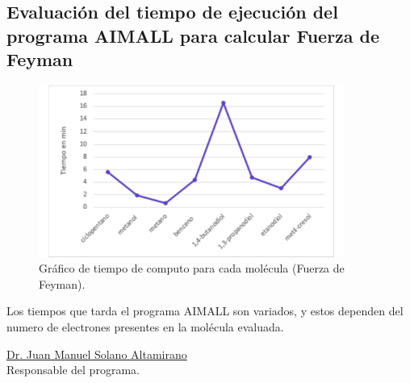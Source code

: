 \documentclass[12pt,letterpaper]{article}
\begin{document}
\subsection{Evaluación del tiempo de ejecución del programa AIMALL para calcular Fuerza de Feyman}

\begin{figure}[H]
 \begin{center}
  \includegraphics[width=10cm]{12.pdf}
  \caption{Gráfico de tiempo de computo para cada molécula (Fuerza de Feyman).}
 \end{center}

\end{figure}
  Los tiempos que tarda el programa AIMALL son variados, y estos dependen del numero de electrones presentes en la molécula evaluada.

  \vfill
\begin{center}
\underline{Dr. Juan Manuel Solano Altamirano}\\
Responsable del programa.
\end{center}
\end{document}

